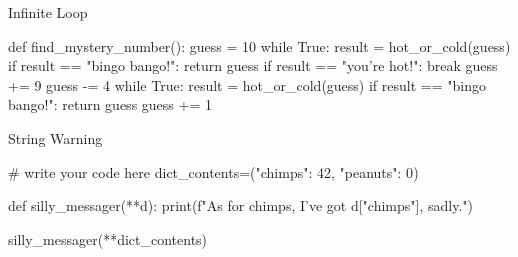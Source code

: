 \documentclass[serif, aspectratio=169]{beamer}
\begin{document}
\begin{frame}[fragile]{Infinite Loop} %
    \begin{pythoncode}
    def find_mystery_number(): 
        guess = 10
        while True:
            result = hot_or_cold(guess)
            if result == "bingo bango!":
                return guess
            if result == "you're hot!":
                break
            guess += 9
        guess -= 4
        while True:
            result = hot_or_cold(guess)
            if result == "bingo bango!":
                return guess    
            guess += 1
    \end{pythoncode}
\end{frame}

\begin{frame}[fragile]{String Warning} %
    \begin{pythoncode}
    # write your code here
    dict_contents=({"chimps": 42, "peanuts": 0})

    def silly_messager(**d):
    print(f"As for chimps, I've got {d["chimps"]}, sadly.")
    
    silly_messager(**dict_contents)
    \end{pythoncode}
\end{frame}
\end{document}
